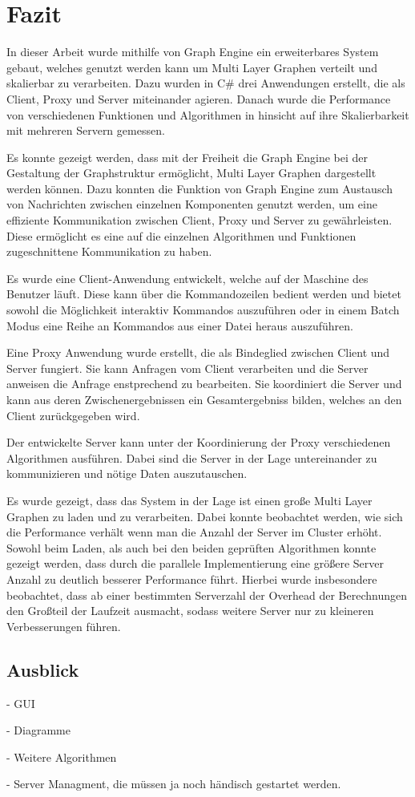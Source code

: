 \chapter{Fazit}

In dieser Arbeit wurde mithilfe von Graph Engine ein erweiterbares System gebaut, welches genutzt werden kann um Multi Layer Graphen verteilt und skalierbar zu verarbeiten.
Dazu wurden in C\# drei Anwendungen erstellt, die als Client, Proxy und Server miteinander agieren.
Danach wurde die Performance von verschiedenen Funktionen und Algorithmen in hinsicht auf ihre Skalierbarkeit mit mehreren Servern gemessen.


Es konnte gezeigt werden, dass mit der Freiheit die Graph Engine bei der Gestaltung der Graphstruktur ermöglicht, Multi Layer Graphen dargestellt werden können.
Dazu konnten die Funktion von Graph Engine zum Austausch von Nachrichten zwischen einzelnen Komponenten genutzt werden, um eine effiziente Kommunikation zwischen Client, Proxy und Server zu gewährleisten. 
Diese ermöglicht es eine auf die einzelnen Algorithmen und Funktionen zugeschnittene Kommunikation zu haben.


Es wurde eine Client-Anwendung entwickelt, welche auf der Maschine des Benutzer läuft. Diese kann über die Kommandozeilen bedient werden und bietet sowohl die Möglichkeit interaktiv Kommandos auszuführen oder in einem Batch Modus eine Reihe an Kommandos aus einer Datei heraus auszuführen.

Eine Proxy Anwendung wurde erstellt, die als Bindeglied zwischen Client und Server fungiert. Sie kann Anfragen vom Client verarbeiten und die Server anweisen die Anfrage enstprechend zu bearbeiten. Sie koordiniert die Server und kann aus deren Zwischenergebnissen ein Gesamtergebniss bilden, welches an den Client zurückgegeben wird.

Der entwickelte Server kann unter der Koordinierung der Proxy verschiedenen Algorithmen ausführen. Dabei sind die Server in der Lage untereinander zu kommunizieren und nötige Daten auszutauschen.


Es wurde gezeigt, dass das System in der Lage ist einen große Multi Layer Graphen zu laden und zu verarbeiten. Dabei konnte beobachtet werden, wie sich die Performance verhält wenn man die Anzahl der Server im Cluster erhöht.
Sowohl beim Laden, als auch bei den beiden geprüften Algorithmen konnte gezeigt werden, dass durch die parallele Implementierung eine größere Server Anzahl zu deutlich besserer Performance führt.
Hierbei wurde insbesondere beobachtet, dass ab einer bestimmten Serverzahl der Overhead der Berechnungen den Großteil der Laufzeit ausmacht, sodass weitere Server nur zu kleineren Verbesserungen führen.


\section{Ausblick}


- GUI

- Diagramme

- Weitere Algorithmen

- Server Managment, die müssen ja noch händisch gestartet werden.
